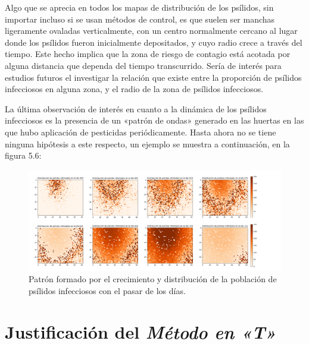 Algo que se aprecia en todos los mapas de distribución de los psílidos, sin importar incluso si se usan métodos de control, es que suelen ser manchas ligeramente ovaladas verticalmente, con un centro normalmente cercano al lugar donde los psílidos fueron inicialmente depositados, y cuyo radio crece a través del tiempo. Este hecho implica que la zona de riesgo de contagio está acotada por alguna distancia que dependa del tiempo transcurrido. Sería de interés para estudios futuros el investigar la relación que existe entre la proporción de psílidos infecciosos en alguna zona, y el radio de la zona de psílidos infecciosos.

La última observación de interés en cuanto a la dinámica de los psílidos infecciosos es la presencia de un «patrón de ondas» generado en las huertas en las que hubo aplicación de pesticidas periódicamente. Hasta ahora no se tiene ninguna hipótesis a este respecto, un ejemplo se muestra a continuación, en la figura 5.6:
\begin{figure}[H]
\centering
\includegraphics[width=1.05\textwidth,keepaspectratio=true]{images/Imágenes C6/C6-5.png}
\caption{Patrón formado por el crecimiento y distribución de la población de psílidos infecciosos con el pasar de los días.}
\end{figure}


\section{Justificación del \textit{Método en «T»}}

